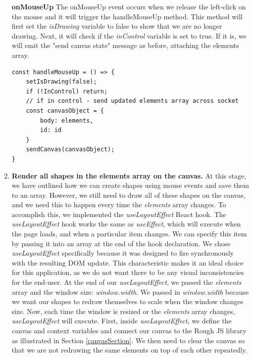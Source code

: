\begin{enumerate}
    \textbf{onMouseUp} \newline 
    The onMouseUp event occurs when we release the left-click on the mouse and it will trigger the handleMouseUp method. This method will first set the \textit{isDrawing} variable to false to show that we are no longer drawing. \newline
    Next, it will check if the \textit{inControl} variable is set to true. If it is, we will emit the "send canvas state" message as before, attaching the elements array. 
    \begin{verbatim}
const handleMouseUp = () => {
    setIsDrawing(false);
    if (!InControl) return;
    // if in control - send updated elements array across socket
    const canvasObject = {
        body: elements,
        id: id
    }
    sendCanvas(canvasObject);
}
    \end{verbatim}
    
    \item \textbf{Render all shapes in the elements array on the canvas.} \newline
    At this stage, we have outlined how we can create shapes using mouse events and save them to an array. However, we still need to draw all of these shapes on the canvas, and we need this to happen every time the \textit{elements} array changes. \newline
    To accomplish this, we implemented the \textit{useLayoutEffect} React hook. The \textit{useLayoutEffect} hook works the same as \textit{useEffect}, which will execute when the page loads, and when a particular item changes. We can specify this item by passing it into an array at the end of the hook declaration. We chose \textit{useLayoutEffect} specifically because it was designed to fire synchronously with the resulting DOM update. This characteristic makes it an ideal choice for this application, as we do not want there to be any visual inconsistencies for the end-user. \newline
    At the end of our \textit{useLayoutEffect}, we passed the \textit{elements} array and the window size: \textit{window.width}. We passed in \textit{window.width} because we want our shapes to redraw themselves to scale when the window changes size. Now, each time the window is resized or the \textit{elements} array changes, \textit{useLayoutEffect} will execute. \newline
    First, inside \textit{useLayoutEffect}, we define the canvas and context variables and connect our canvas to the Rough JS library as illustrated in Section \ref{canvasSection}. We then need to clear the canvas so that we are not redrawing the same elements on top of each other repeatedly. 
    

\end{enumerate}
